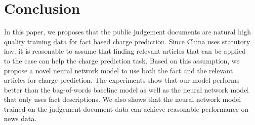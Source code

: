 \section{Conclusion}
In this paper, we proposes that the public judgement documents are natural high quality training data for fact based charge prediction. Since China uses statutory law, it is reasonable to assume that finding relevant articles that can be applied to the case can help the charge prediction task.  Based on this assumption, we propose a novel neural network model to use both the fact and the relevant articles for charge prediction. The experiments show that our model performs better than the bag-of-words baseline model as well as the neural network model that only uses fact descriptions. We also shows that the neural network model trained on the judgement document data can achieve reasonable performance on news data.